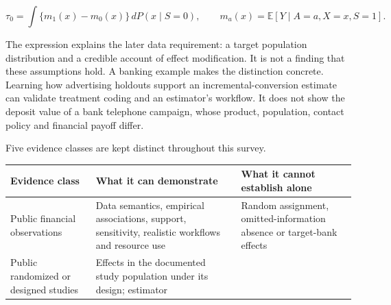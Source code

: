 \[
\tau_0=\int\{m_1(x)-m_0(x)\}\,dP(x\mid S=0),
\qquad m_a(x)=\mathbb E[Y\mid A=a,X=x,S=1].
\]

The expression explains the later data requirement: a target population
distribution and a credible account of effect modification. It is not a
finding that these assumptions hold. A banking example makes the
distinction concrete. Learning how advertising holdouts support an
incremental-conversion estimate can validate treatment coding and an
estimator's workflow. It does not show the deposit value of a bank
telephone campaign, whose product, population, contact policy and
financial payoff differ.

Five evidence classes are kept distinct throughout this survey.

\begin{longtable}[]{@{}>{\raggedright\arraybackslash}p{}>{\raggedright\arraybackslash}p{}>{\raggedright\arraybackslash}p{}@{}}
\toprule
\begin{minipage}[b]{\linewidth}\raggedright
Evidence class\strut
\end{minipage} & \begin{minipage}[b]{\linewidth}\raggedright
What it can demonstrate\strut
\end{minipage} & \begin{minipage}[b]{\linewidth}\raggedright
What it cannot establish alone\strut
\end{minipage}\tabularnewline
\midrule
\endhead
\begin{minipage}[t]{\linewidth}\raggedright
Public financial observations\strut
\end{minipage} & \begin{minipage}[t]{\linewidth}\raggedright
Data semantics, empirical associations, support, sensitivity, realistic
workflows and resource use\strut
\end{minipage} & \begin{minipage}[t]{\linewidth}\raggedright
Random assignment, omitted-information absence or target-bank
effects\strut
\end{minipage}\tabularnewline
\begin{minipage}[t]{\linewidth}\raggedright
Public randomized or designed studies\strut
\end{minipage} & \begin{minipage}[t]{\linewidth}\raggedright
Effects in the documented study population under its design; estimator

\end{minipage}
\end{longtable}
